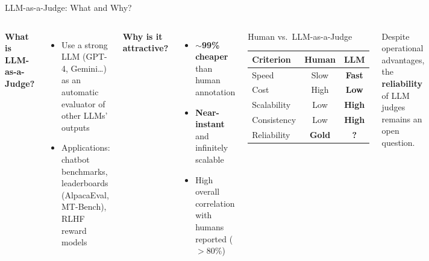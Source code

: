 \documentclass[aspectratio=169,10pt]{beamer}
\newcommand{\good}[1]{\textcolor{green!60!black}{\textbf{#1}}}
\newcommand{\bad}[1]{\textcolor{aclred}{\textbf{#1}}}
\begin{document}
\begin{frame}{LLM-as-a-Judge: What and Why?}
  \begin{columns}[T]
      \textbf{What is LLM-as-a-Judge?}
      \begin{itemize}
        \item Use a strong LLM (GPT-4, Gemini…) as an \alert{automatic evaluator} of other LLMs' outputs
        \item Applications: chatbot benchmarks, leaderboards (AlpacaEval, MT-Bench), RLHF reward models
      \end{itemize}

      \vspace{0.6em}
      \textbf{Why is it attractive?}
      \begin{itemize}
        \item \good{$\sim$99\% cheaper} than human annotation
        \item \good{Near-instant} and infinitely scalable
        \item High overall correlation with humans reported ($>$80\%)
      \end{itemize}

      \begin{block}{Human vs.\ LLM-as-a-Judge}
        \small
        \begin{tabular}{lcc}
          \toprule
          \textbf{Criterion} & \textbf{Human} & \textbf{LLM} \\
          \midrule
          Speed       & Slow   & \good{Fast}   \\
          Cost        & High   & \good{Low}    \\
          Scalability & Low    & \good{High}   \\
          Consistency & Low    & \good{High}   \\
          Reliability & \good{Gold} & \bad{?}  \\
          \bottomrule
        \end{tabular}
      \end{block}
      \vspace{0.4em}
      \small\alert{Despite operational advantages, the \textbf{reliability} of LLM judges remains an open question.}
  \end{columns}
\end{frame}
\end{document}

